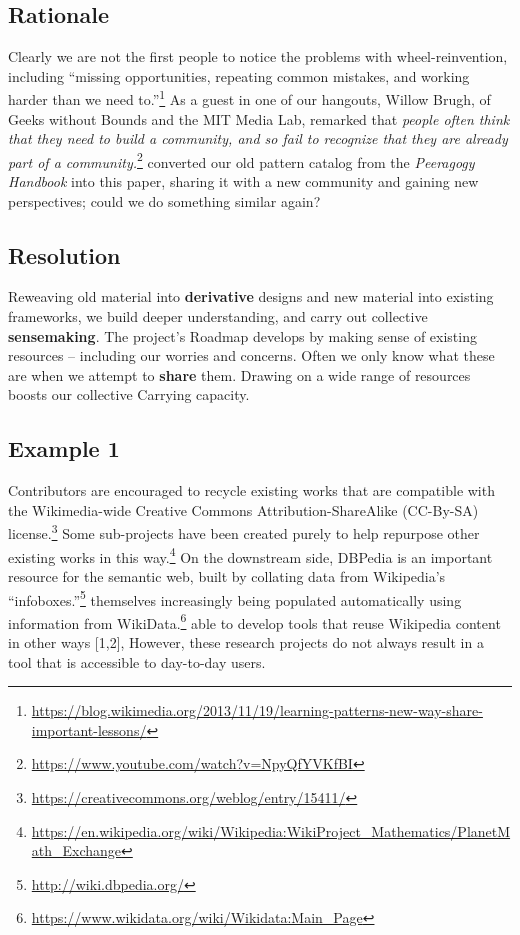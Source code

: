 \hypertarget{rationale}{%
\subsection{Rationale}\label{rationale}}

Clearly we are not the first people to notice the problems with
wheel-reinvention, including ``missing opportunities, repeating common
mistakes, and working harder than we need to.''\footnote{\url{https://blog.wikimedia.org/2013/11/19/learning-patterns-new-way-share-important-lessons/}}
As a guest in one of our hangouts, Willow Brugh, of Geeks without Bounds
and the MIT Media Lab, remarked that \emph{people often think that they
need to build a community, and so fail to recognize that they are
already part of a community.}\footnote{\url{https://www.youtube.com/watch?v=NpyQfYVKfBI}}
converted our old pattern catalog from the \emph{Peeragogy Handbook}
into this paper, sharing it with a new community and gaining new
perspectives; could we do something similar again?

\hypertarget{resolution}{%
\subsection{Resolution}\label{resolution}}

Reweaving old material into \textbf{derivative} designs and new material
into existing frameworks, we build deeper understanding, and carry out
collective \textbf{sensemaking}. The project's {{Roadmap}} develops by
making sense of existing resources -- including our worries and
concerns. Often we only know what these are when we attempt to
\textbf{share} them. Drawing on a wide range of resources boosts our
collective {{Carrying capacity}}.

\hypertarget{example-1}{%
\subsection{Example 1}\label{example-1}}

Contributors are encouraged to recycle existing works that are
compatible with the Wikimedia-wide Creative Commons
Attribution-ShareAlike (CC-By-SA) license.\footnote{\url{https://creativecommons.org/weblog/entry/15411/}}
Some sub-projects have been created purely to help repurpose other
existing works in this way.\footnote{\url{https://en.wikipedia.org/wiki/Wikipedia:WikiProject_Mathematics/PlanetMath_Exchange}}
On the downstream side, DBPedia is an important resource for the
semantic web, built by collating data from Wikipedia's
``infoboxes.''\footnote{\url{http://wiki.dbpedia.org/}} themselves
increasingly being populated automatically using information from
WikiData.\footnote{\url{https://www.wikidata.org/wiki/Wikidata:Main_Page}}
able to develop tools that reuse Wikipedia content in other ways
{{[}1,2{]}}, However, these research projects do not always result in a
tool that is accessible to day-to-day users.

